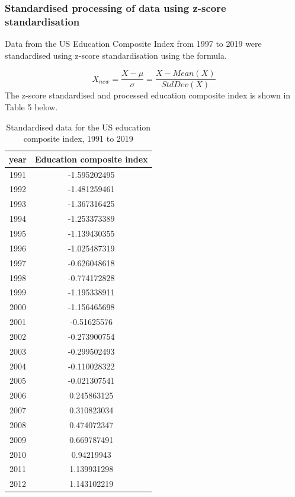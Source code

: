 \documentclass{apmcmthesis}
\begin{document}
\subsubsection{Standardised processing of data using z-score standardisation}
Data from the US Education Composite Index from 1997 to 2019 were standardised using z-score standardisation using the formula.

\begin{equation}
	X_{new}=\frac{X-\mu}{\sigma}=\frac{X-Mean(X)}{StdDev(X)}
\end{equation}
The z-score standardised and processed education composite index is shown in Table 5 below. 
\begin{table}[H]
	\caption{Standardised data for the US education composite index, 1991 to 2019}\label{tab:105} \centering
	\begin{tabular}{cc}
		\toprule[1.5pt]
		year & Education composite index \\
		\midrule[1pt]
		1991 & -1.595202495              \\
		1992 & -1.481259461              \\
		1993 & -1.367316425              \\
		1994 & -1.253373389              \\
		1995 & -1.139430355              \\
		1996 & -1.025487319              \\
		1997 & -0.626048618              \\
		1998 & -0.774172828              \\
		1999 & -1.195338911              \\
		2000 & -1.156465698              \\
		2001 & -0.51625576               \\
		2002 & -0.273900754              \\
		2003 & -0.299502493              \\
		2004 & -0.110028322              \\
		2005 & -0.021307541              \\
		2006 & 0.245863125               \\
		2007 & 0.310823034               \\
		2008 & 0.474072347               \\
		2009 & 0.669787491               \\
		2010 & 0.94219943                \\
		2011 & 1.139931298               \\
		2012 & 1.143102219              \\
		\bottomrule[1.5pt]      
	\end{tabular}
\end{table}
\end{document}
